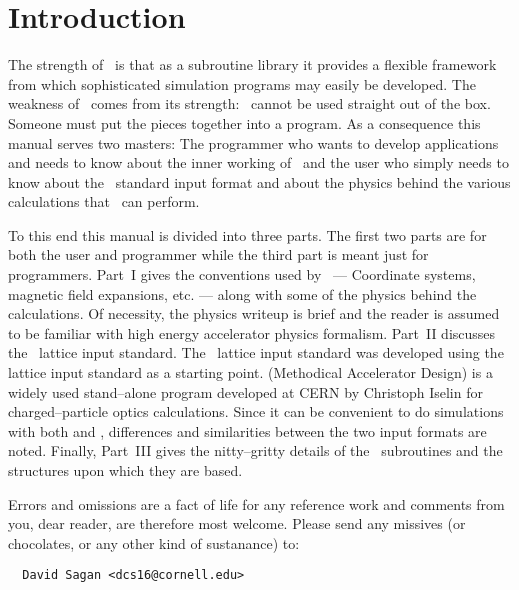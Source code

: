 \section*{Introduction}

The strength of \bmad\ is that as a subroutine library it provides a
flexible framework from which sophisticated simulation programs may
easily be developed.  The weakness of \bmad\ comes from its strength:
\bmad\ cannot be used straight out of the box. Someone must put the
pieces together into a program. As a consequence this manual serves
two masters: The programmer who wants to develop applications and
needs to know about the inner working of \bmad\ and the user who simply 
needs to know about
the \bmad\ standard input format and about the physics behind the various
calculations that \bmad\ can perform.

To this end this manual is divided into three parts. The first two
parts are for both the user and programmer while the third part is
meant just for programmers. Part~I gives the conventions used by
\bmad\ --- Coordinate systems, magnetic field expansions, etc. ---
along with some of the physics behind the calculations. Of necessity,
the physics writeup is brief and the reader is assumed to be familiar
with high energy accelerator physics formalism. Part~II discusses the
\bmad\ lattice input standard.  The \bmad\ lattice input standard was
developed using the \mad lattice input standard as a starting
point. \mad (Methodical Accelerator Design) is a widely used
stand--alone program developed at CERN by Christoph Iselin for
charged--particle optics calculations. Since it can be convenient
to do simulations with both \mad and \bmad, differences and
similarities between the two input formats are noted. 
Finally, Part~III gives the nitty--gritty details of the \bmad\
subroutines and the structures upon which they are based.

Errors and omissions are a fact of life for any reference work and
comments from you, dear reader, are therefore most welcome. Please
send any missives (or chocolates, or any other kind of sustanance) to:
\begin{verbatim}
  David Sagan <dcs16@cornell.edu>
\end{verbatim}
